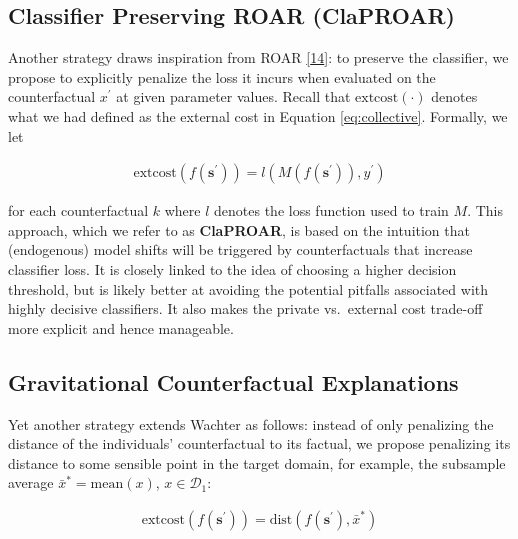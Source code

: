 \documentclass[conference,final,]{IEEEtran}
\theoremstyle{definition}
\theoremstyle{definition}
\theoremstyle{definition}
\theoremstyle{definition}
\theoremstyle{remark}
\begin{document}
\hypertarget{classifier-preserving-roar-claproar}{%
\subsection{Classifier Preserving ROAR (ClaPROAR)}\label{classifier-preserving-roar-claproar}}

Another strategy draws inspiration from ROAR \protect\hyperlink{ref-upadhyay2021robust}{{[}14{]}}: to preserve the classifier, we propose to explicitly penalize the loss it incurs when evaluated on the counterfactual \(x^\prime\) at given parameter values. Recall that \(\text{extcost}(\cdot)\) denotes what we had defined as the external cost in Equation \eqref{eq:collective}. Formally, we let

\begin{equation}
\begin{aligned}
\text{extcost}(f(\mathbf{s}^\prime)) = l(M(f(\mathbf{s}^\prime)),y^\prime) \label{eq:clap}
\end{aligned}
\end{equation}

for each counterfactual \(k\) where \(l\) denotes the loss function used to train \(M\). This approach, which we refer to as \textbf{ClaPROAR}, is based on the intuition that (endogenous) model shifts will be triggered by counterfactuals that increase classifier loss. It is closely linked to the idea of choosing a higher decision threshold, but is likely better at avoiding the potential pitfalls associated with highly decisive classifiers. It also makes the private vs.~external cost trade-off more explicit and hence manageable.

\hypertarget{gravitational-counterfactual-explanations}{%
\subsection{Gravitational Counterfactual Explanations}\label{gravitational-counterfactual-explanations}}

Yet another strategy extends Wachter as follows: instead of only penalizing the distance of the individuals' counterfactual to its factual, we propose penalizing its distance to some sensible point in the target domain, for example, the subsample average \(\bar{x}^*=\text{mean}(x)\), \(x \in \mathcal{D}_1\):

\begin{equation}
\begin{aligned}
\text{extcost}(f(\mathbf{s}^\prime)) = \text{dist}(f(\mathbf{s}^\prime),\bar{x}^*)  \label{eq:grav}
\end{aligned}
\end{equation}
\end{document}
